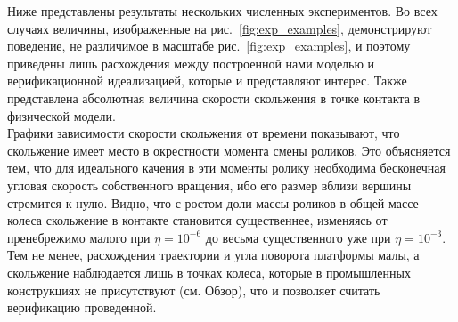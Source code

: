 \documentclass[12pt]{article}
\begin{document}
Ниже представлены результаты нескольких численных экспериментов. Во всех случаях величины, изображенные на рис.~\ref{fig:exp_examples}, демонстрируют поведение, не различимое в масштабе рис.~\ref{fig:exp_examples}, и поэтому приведены лишь расхождения между построенной нами моделью и верификационной идеализацией, которые и представляют интерес. Также представлена абсолютная величина скорости скольжения в точке контакта в физической модели.\\

Графики зависимости скорости скольжения от времени показывают, что скольжение имеет место в окрестности момента смены роликов. Это объясняется тем, что для идеального качения в эти моменты ролику необходима бесконечная угловая скорость собственного вращения, ибо его размер вблизи вершины стремится к нулю. Видно, что с ростом доли массы роликов в общей массе колеса скольжение в контакте становится существеннее, изменяясь от пренебрежимо малого при $\eta = 10^{-6}$ до весьма существенного уже при $\eta = 10^{-3}$. Тем не менее, расхождения траектории и угла поворота платформы малы, а скольжение наблюдается лишь в точках колеса, которые в промышленных конструкциях не присутствуют (см. Обзор), что и позволяет считать верификацию проведенной.
\end{document}
